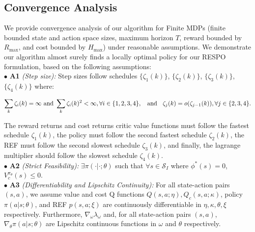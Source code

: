 \documentclass{article}
\theoremstyle{definition}
\begin{document}
\subsection{Convergence Analysis}
\label{sec:ConvergenceAnalysis}
We provide convergence analysis of our algorithm for Finite MDPs (finite bounded state and action space sizes, maximum horizon $T$, reward bounded by $R_{\max}$, and cost bounded by $H_{\max}$) under reasonable assumptions. We demonstrate our algorithm almost surely finds a locally optimal policy for our RESPO formulation, based on the following assumptions:\\ $\bullet$ \hspace{0.3cm}\textbf{A1}\emph{ (Step size):} Step sizes follow schedules $\{\zeta_1(k)\}$, $\{\zeta_2(k)\}$, $\{\zeta_3(k)\}$, $\{\zeta_4(k)\}$ where:

\vspace{-20pt}
\begin{equation*}
    \sum_{k} \zeta_i(k) = \infty \text{ and } \sum_{k} \zeta_i(k)^2 < \infty, \forall i\in \{1,2,3,4\}, \hspace{0.2 cm}\text{ and }\hspace{0.2 cm} \zeta_j(k) = o(\zeta_{j-1}(k)), \forall j\in\{2,3,4\}. 
\end{equation*}

\vspace{-12pt}
The reward returns and cost returns critic value functions must follow the fastest schedule $\zeta_1(k)$, the policy must follow the second fastest schedule $\zeta_2(k)$, the REF must follow the second slowest schedule $\zeta_3(k)$, and finally, the lagrange multiplier should follow the slowest schedule $\zeta_4(k)$.\\
$\bullet$ \hspace{0.3cm}\textbf{A2}\emph{ (Strict Feasibility):} $\exists\pi(\cdot | \cdot; \theta)$ such that $\forall s\in \mathcal{S}_I$ where $\phi^*(s)=0$, $V^{\pi_\theta}_c(s)\leq 0$.\\
$\bullet$ \hspace{0.3cm}\textbf{A3}\emph{ (Differentiability and Lipschitz Continuity):} For all state-action pairs $(s,a)$, we assume value and cost Q functions $Q(s,a;\eta),Q_c(s,a;\kappa)$, policy $\pi(a|s; \theta)$, and REF $p(s,a;\xi)$ are continuously differentiable in $\eta,\kappa,\theta,\xi$ respectively. Furthermore, $\nabla_\omega \lambda_\omega$ and, for all state-action pairs $(s,a)$, $\nabla_\theta \pi(a|s;\theta)$ are Lipschitz continuous functions in  $\omega$ and  $\theta$ respectively.
\end{document}
